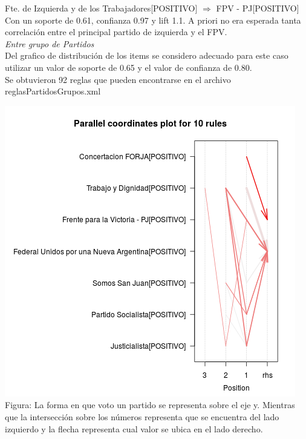 \documentclass{endm}
\begin{document}
{Fte. de Izquierda y de los Trabajadores[POSITIVO]} $\Longrightarrow$ {FPV - PJ[POSITIVO]}\\

Con un soporte de 0.61, confianza 0.97 y lift 1.1. A priori no era esperada tanta correlación entre el principal partido de izquierda y el FPV. \\

\textit{Entre grupo de Partidos} \\

Del grafico de distribución de los items se considero adecuado para este caso utilizar un valor de soporte de 0.65 y el valor de confianza de 0.80. \\

Se obtuvieron 92 reglas que pueden encontrarse en el archivo reglasPartidosGrupos.xml \\

\begin{center}
\includegraphics[scale=0.4]{graficos/paracoordPartidosGrupos.png} \\
\scriptsize{Figura: La forma en que voto un partido se representa sobre el eje y. Mientras que la intersección sobre  los números representa que se encuentra del lado izquierdo y la flecha representa cual valor se ubica en el lado derecho.} \\
\end{center} 
\end{document}
